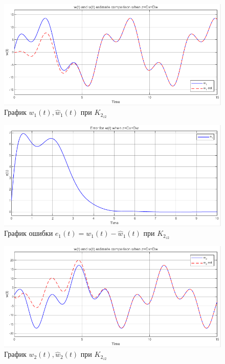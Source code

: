 \documentclass[a4paper, 12pt]{article}
\begin{document}
    \begin{figure}[H]
        \centering
        \includegraphics[scale=0.75]{3task_wwh1cd.png}
        \captionsetup{skip=0pt}
        \caption{График $w_1(t),\hat{w}_1(t)$ при $K_{2_{z2}}$}
        \label{fig:3task_wwh1cd}
    \end{figure}
    \begin{figure}[H]
        \centering
        \includegraphics[scale=0.75]{3task_we1cd.png}
        \captionsetup{skip=0pt}
        \caption{График ошибки $e_1(t)=w_1(t)-\hat{w}_1(t)$ при $K_{2_{z2}}$}
        \label{fig:3task_we1cd}
    \end{figure}
    \begin{figure}[H]
        \centering
        \includegraphics[scale=0.75]{3task_wwh2cd.png}
        \captionsetup{skip=0pt}
        \caption{График $w_2(t),\hat{w}_2(t)$ при $K_{2_{z2}}$}
        \label{fig:3task_wwh2cd}
    \end{figure}
\end{document}

